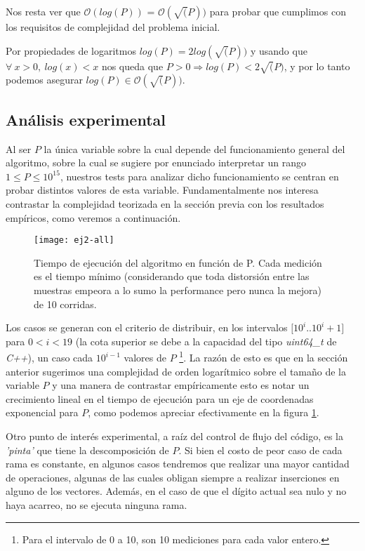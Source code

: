 	Nos resta ver que $\mathcal{O} (log(P))$ = $\mathcal{O} (\sqrt(P))$ para probar que cumplimos con los requisitos de complejidad del problema inicial.

	Por propiedades de logaritmos $log(P) = 2log(\sqrt(P))$ y usando que $\forall \ x > 0, \ log(x) < x$ nos queda que $ P > 0 \Longrightarrow log(P) < 2\sqrt(P)$, y por lo tanto podemos asegurar $log(P) \in \mathcal{O} (\sqrt(P))$.

\subsection{Análisis experimental}

	Al ser $P$ la única variable sobre la cual depende del funcionamiento general del algoritmo, sobre la cual se sugiere por enunciado interpretar un rango $1 \leq P \leq 10^{15}$, nuestros tests para analizar dicho funcionamiento se centran en probar distintos valores de esta variable. Fundamentalmente nos interesa contrastar la complejidad teorizada en la sección previa con los resultados empíricos, como veremos a continuación.
	\\

\begin{figure}[H]
    \centering
    \texttt{[image: ej2-all]}
    \caption{Tiempo de ejecución del algoritmo en función de P. Cada medición es el tiempo mínimo (considerando que toda distorsión entre las muestras empeora a lo sumo la performance pero nunca la mejora) de 10 corridas.}
    \label{fig:ej2-fig}
\end{figure}

	Los casos se generan con el criterio de distribuir, en los intervalos $[10^i$..$10^i+1]$ para $0 < i < 19$ (la cota superior se debe a la capacidad del tipo \emph{uint64_t} de \emph{C++}), un caso cada $10^{i-1}$ valores de $P$ \footnote{Para el intervalo de 0 a 10, son 10 mediciones para cada valor entero.}. La razón de esto es que en la sección anterior sugerimos una complejidad de orden logarítmico sobre el tamaño de la variable $P$ y una manera de contrastar empíricamente esto es notar un crecimiento lineal en el tiempo de ejecución para un eje de coordenadas exponencial para $P$, como podemos apreciar efectivamente en la figura \ref{fig:ej2-fig}.

	Otro punto de interés experimental, a raíz del control de flujo del código, es la \emph{'pinta'} que tiene la descomposición de $P$. Si bien el costo de peor caso de cada rama es constante, en algunos casos tendremos que realizar una mayor cantidad de operaciones, algunas de las cuales obligan siempre a realizar inserciones en alguno de los vectores. Además, en el caso de que el dígito actual sea nulo y no haya acarreo, no se ejecuta ninguna rama.

